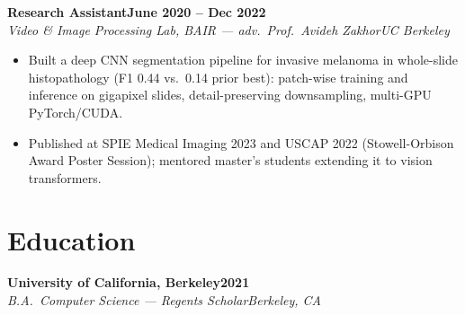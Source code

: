 \documentclass[10pt]{article}
\newcommand{\role}[4]{\textbf{#1}\hfill\textbf{#2}\\\textit{#3}\hfill\textit{#4}}
\begin{document}

\role{Research Assistant}{June 2020 -- Dec 2022}{Video \& Image Processing Lab, BAIR --- adv.\ Prof.\ Avideh Zakhor}{UC Berkeley}
\begin{itemize}
\item Built a deep CNN segmentation pipeline for invasive melanoma in whole-slide histopathology (F1 0.44 vs.\ 0.14 prior best): patch-wise training and inference on gigapixel slides, detail-preserving downsampling, multi-GPU PyTorch/CUDA.
\item Published at SPIE Medical Imaging 2023 and USCAP 2022 (Stowell-Orbison Award Poster Session); mentored master's students extending it to vision transformers.
\end{itemize}


\section*{Education}

\role{University of California, Berkeley}{2021}{B.A.\ Computer Science --- Regents Scholar}{Berkeley, CA}
\end{document}

